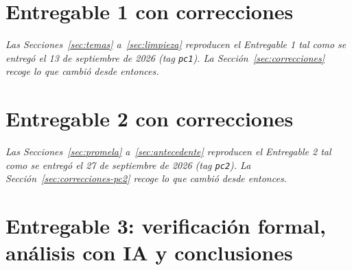 \documentclass[12pt,a4paper]{article}
\begin{document}


\tableofcontents
\clearpage




\part{Entregable 1 con correcciones}\label{parte:pc1}
\noindent\emph{Las Secciones~\ref{sec:temas} a~\ref{sec:limpieza} reproducen el Entregable 1 tal
como se entregó el 13 de septiembre de 2026 (tag \texttt{pc1}). La Sección~\ref{sec:correcciones}
recoge lo que cambió desde entonces.}





\part{Entregable 2 con correcciones}\label{parte:pc2}
\noindent\emph{Las Secciones~\ref{sec:promela} a~\ref{sec:antecedente} reproducen el Entregable 2
tal como se entregó el 27 de septiembre de 2026 (tag \texttt{pc2}). La
Sección~\ref{sec:correcciones-pc2} recoge lo que cambió desde entonces.}









\part{Entregable 3: verificación formal, análisis con IA y conclusiones}\label{parte:tp}






\clearpage
\printbibliography[title={Referencias}]

\appendix

\end{document}
